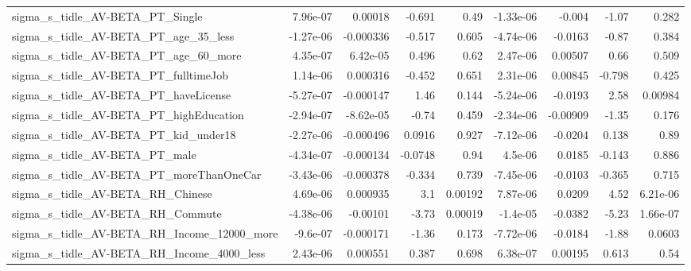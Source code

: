 \begin{tabular}{lrrrrrrrr}
sigma\_s\_tidle\_AV-BETA\_PT\_Single                    &    7.96e-07 &      0.00018 &   -0.691 &     0.49 &  -1.33e-06 &      -0.004 &        -1.07 &         0.282 \\
sigma\_s\_tidle\_AV-BETA\_PT\_age\_35\_less               &   -1.27e-06 &    -0.000336 &   -0.517 &    0.605 &  -4.74e-06 &     -0.0163 &        -0.87 &         0.384 \\
sigma\_s\_tidle\_AV-BETA\_PT\_age\_60\_more               &    4.35e-07 &     6.42e-05 &    0.496 &     0.62 &   2.47e-06 &     0.00507 &         0.66 &         0.509 \\
sigma\_s\_tidle\_AV-BETA\_PT\_fulltimeJob               &    1.14e-06 &     0.000316 &   -0.452 &    0.651 &   2.31e-06 &     0.00845 &       -0.798 &         0.425 \\
sigma\_s\_tidle\_AV-BETA\_PT\_haveLicense               &   -5.27e-07 &    -0.000147 &     1.46 &    0.144 &  -5.24e-06 &     -0.0193 &         2.58 &       0.00984 \\
sigma\_s\_tidle\_AV-BETA\_PT\_highEducation             &   -2.94e-07 &    -8.62e-05 &    -0.74 &    0.459 &  -2.34e-06 &    -0.00909 &        -1.35 &         0.176 \\
sigma\_s\_tidle\_AV-BETA\_PT\_kid\_under18               &   -2.27e-06 &    -0.000496 &   0.0916 &    0.927 &  -7.12e-06 &     -0.0204 &        0.138 &          0.89 \\
sigma\_s\_tidle\_AV-BETA\_PT\_male                      &   -4.34e-07 &    -0.000134 &  -0.0748 &     0.94 &    4.5e-06 &      0.0185 &       -0.143 &         0.886 \\
sigma\_s\_tidle\_AV-BETA\_PT\_moreThanOneCar            &   -3.43e-06 &    -0.000378 &   -0.334 &    0.739 &  -7.45e-06 &     -0.0103 &       -0.365 &         0.715 \\
sigma\_s\_tidle\_AV-BETA\_RH\_Chinese                   &    4.69e-06 &     0.000935 &      3.1 &  0.00192 &   7.87e-06 &      0.0209 &         4.52 &      6.21e-06 \\
sigma\_s\_tidle\_AV-BETA\_RH\_Commute                   &   -4.38e-06 &     -0.00101 &    -3.73 &  0.00019 &   -1.4e-05 &     -0.0382 &        -5.23 &      1.66e-07 \\
sigma\_s\_tidle\_AV-BETA\_RH\_Income\_12000\_more         &    -9.6e-07 &    -0.000171 &    -1.36 &    0.173 &  -7.72e-06 &     -0.0184 &        -1.88 &        0.0603 \\
sigma\_s\_tidle\_AV-BETA\_RH\_Income\_4000\_less          &    2.43e-06 &     0.000551 &    0.387 &    0.698 &   6.38e-07 &     0.00195 &        0.613 &          0.54 \\

\end{tabular}

